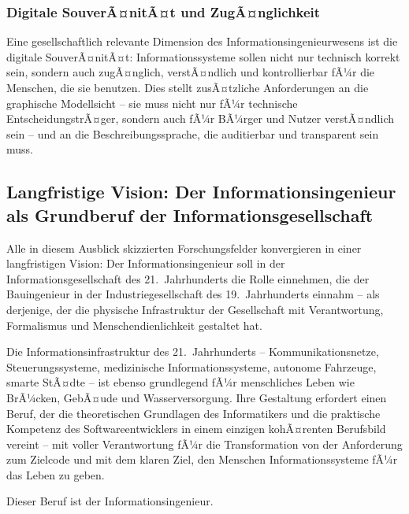 ﻿\documentclass[a4paper,12pt]{article}
\theoremstyle{definition}
\begin{document}
\subsubsection{Digitale SouverÃ¤nitÃ¤t und ZugÃ¤nglichkeit}

Eine gesellschaftlich relevante Dimension des Informationsingenieurwesens ist die
digitale SouverÃ¤nitÃ¤t: Informationssysteme sollen nicht nur technisch korrekt sein,
sondern auch zugÃ¤nglich, verstÃ¤ndlich und kontrollierbar fÃ¼r die Menschen, die sie
benutzen. Dies stellt zusÃ¤tzliche Anforderungen an die graphische Modellsicht --
sie muss nicht nur fÃ¼r technische EntscheidungstrÃ¤ger, sondern auch fÃ¼r BÃ¼rger und
Nutzer verstÃ¤ndlich sein -- und an die Beschreibungssprache, die auditierbar und
transparent sein muss.

\subsection{Langfristige Vision: Der Informationsingenieur als Grundberuf der Informationsgesellschaft}

Alle in diesem Ausblick skizzierten Forschungsfelder konvergieren in einer
langfristigen Vision: Der Informationsingenieur soll in der Informationsgesellschaft
des 21.~Jahrhunderts die Rolle einnehmen, die der Bauingenieur in der Industriegesellschaft
des 19.~Jahrhunderts einnahm -- als derjenige, der die physische Infrastruktur der
Gesellschaft mit Verantwortung, Formalismus und Menschendienlichkeit gestaltet hat.

Die Informationsinfrastruktur des 21.~Jahrhunderts -- Kommunikationsnetze, Steuerungssysteme,
medizinische Informationssysteme, autonome Fahrzeuge, smarte StÃ¤dte -- ist ebenso
grundlegend fÃ¼r menschliches Leben wie BrÃ¼cken, GebÃ¤ude und Wasserversorgung.
Ihre Gestaltung erfordert einen Beruf, der die theoretischen Grundlagen des Informatikers
und die praktische Kompetenz des Softwareentwicklers in einem einzigen kohÃ¤renten
Berufsbild vereint -- mit voller Verantwortung fÃ¼r die Transformation von der
Anforderung zum Zielcode und mit dem klaren Ziel, den Menschen Informationssysteme
fÃ¼r das Leben zu geben.

Dieser Beruf ist der Informationsingenieur.
\end{document}
